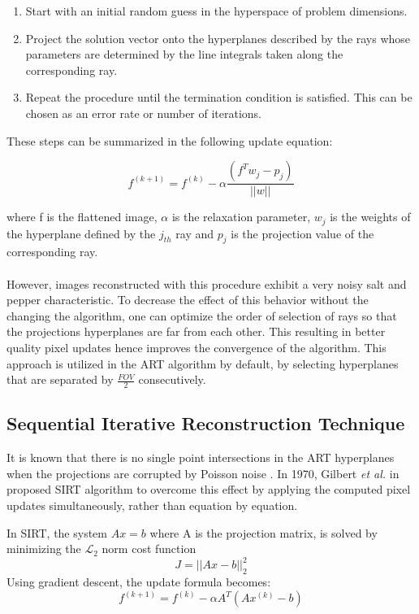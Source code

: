\documentclass[journal]{IEEEtran}
\begin{document}
\begin{enumerate}
	\item Start with an initial random guess in the hyperspace of problem dimensions. 
	\item Project the solution vector onto the hyperplanes described by the rays whose parameters are determined by the line integrals taken along the corresponding ray. 
	\item Repeat the procedure until the termination condition is satisfied. This can be chosen as an error rate or number of iterations.  
\end{enumerate}

These steps can be summarized in the following update equation: 

\begin{equation}
	f^{(k+1)} = f^{(k)} - \alpha\frac{(f^Tw_j - p_j)}{||w||} 
\end{equation}

where f is the flattened image, $\alpha$ is the relaxation parameter, $w_j$ is the weights of the hyperplane defined by the $j_{th}$ ray and $p_j$ is the projection value of the corresponding ray. 
\\
\\
However, images reconstructed with this procedure exhibit a very noisy salt and pepper characteristic. To decrease the effect of this behavior without the changing the algorithm, one can optimize the order of selection of rays so that the projections hyperplanes are far from each other. This resulting in better quality pixel updates hence improves the convergence of the algorithm. This approach is utilized in the ART algorithm by default, by selecting hyperplanes that are separated by $\frac{FOV}{2}$ consecutively.

\subsection{Sequential Iterative Reconstruction Technique}

It is known that there is no single point intersections in the ART hyperplanes when the projections are corrupted by Poisson noise \cite*{dong2020accelerated}.  
In 1970, Gilbert \textit{et al.} in \cite*{gilbert1972iterative} proposed SIRT algorithm to overcome this effect by applying the computed pixel updates simultaneously, rather than equation by equation. 

In SIRT, the system $Ax=b$ where A is the projection matrix, is solved by minimizing the $\mathcal{L_2}$ norm cost function $$J = ||Ax-b||_2^2$$
Using gradient descent, the update formula becomes:
\begin{equation}
	f^{(k+1)} = f^{(k)} - \alpha A^T(Ax^{(k)}-b)
\end{equation}
\end{document}
